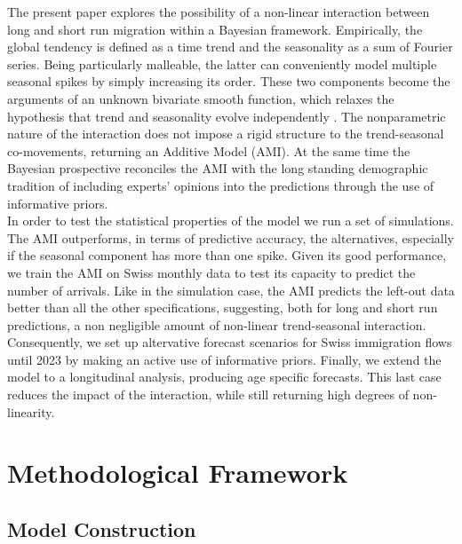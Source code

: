 \documentclass{article}\usepackage[]{graphicx}\usepackage[]{color}
\begin{document}
The present paper explores the possibility of a non-linear interaction between long and short run migration within a Bayesian framework. Empirically, the global tendency is defined as a time trend and the seasonality as a sum of Fourier series. Being particularly malleable, the latter can conveniently model multiple seasonal spikes by simply increasing its order. These two components become the arguments of an unknown bivariate smooth function, which relaxes the hypothesis that trend and seasonality evolve independently \cite{koopman2009seasonality, hindrayanto2014trend}. The nonparametric nature of the interaction does not impose a rigid structure to the trend-seasonal co-movements, returning an Additive Model (AMI). At the same time the Bayesian prospective reconciles the AMI with the long standing demographic tradition of including experts' opinions into the predictions through the use of informative priors.\\
In order to test the statistical properties of the model we run a set of simulations. The AMI outperforms, in terms of predictive accuracy, the alternatives, especially if the seasonal component has more than one spike. Given its good performance, we train the AMI on Swiss monthly data to test its capacity to predict the number of arrivals. Like in the simulation case, the AMI predicts the left-out data better than all the other specifications, suggesting, both for long and short run predictions, a non negligible amount of non-linear trend-seasonal interaction. Consequently, we set up altervative forecast scenarios for Swiss immigration flows until 2023 by making an active use of informative priors. Finally, we extend the model to a longitudinal analysis, producing age specific forecasts. This last case reduces the impact of the interaction, while still returning high degrees of non-linearity.



\section{Methodological Framework}\label{methodology}

\subsection{Model Construction}\label{model}
\end{document}
